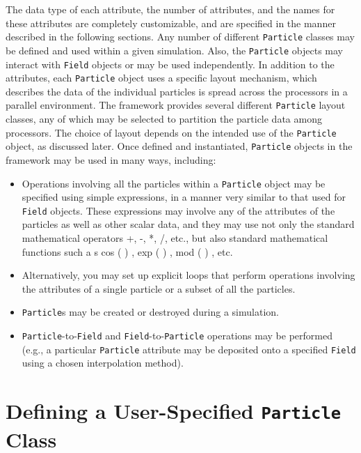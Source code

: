 The data type of each attribute, the number of attributes, and the names for these attributes are completely customizable, and are specified in the manner described in the following sections. Any number of different \texttt{Particle} classes may be defined and used within a given simulation. Also, the \texttt{Particle} objects may interact with \ippl \texttt{Field} objects or may be used independently. In addition to the attributes, each \texttt{Particle} object uses a specific layout mechanism, which describes the data of the individual particles is spread across the processors in a parallel environment. The \ippl framework provides several different \texttt{Particle} layout classes, any of which may be selected to partition the particle data among processors. The choice of layout depends on the intended use of the \texttt{Particle} object, as discussed later. Once defined and instantiated, \texttt{Particle} objects in the \ippl framework may be used in many ways, including:
\begin{itemize}
    \item Operations involving all the particles within a \texttt{Particle} object may be specified using simple expressions, in a manner very similar to that used for \texttt{Field} objects. These expressions may involve any of the attributes of the particles as well as other scalar data, and they may use not only the standard mathematical operators +, -, *, /, etc., but also standard mathematical functions such a s cos ( ) , exp ( ) , mod ( ) , etc.
    \item Alternatively, you may set up explicit loops that perform operations involving the attributes of a single particle or a subset of all the particles.
    \item \texttt{Particle}s may be created or destroyed during a simulation.
    \item \texttt{Particle}-to-\texttt{Field} and \texttt{Field}-to-\texttt{Particle} operations may be performed (e.g., a particular \texttt{Particle} attribute may be deposited onto a specified \texttt{Field} using a chosen interpolation method).
\end{itemize}

\section{Defining a User-Specified \texttt{Particle} Class}

